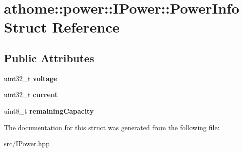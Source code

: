 \hypertarget{structathome_1_1power_1_1_i_power_1_1_power_info}{}\section{athome\+:\+:power\+:\+:I\+Power\+:\+:Power\+Info Struct Reference}
\label{structathome_1_1power_1_1_i_power_1_1_power_info}
\subsection*{Public Attributes}
\begin{DoxyCompactItemize}
\item 
\mbox{\label{structathome_1_1power_1_1_i_power_1_1_power_info_a62f956c304f45bb1b89eb81cc0c13845}} 
uint32\+\_\+t {\bfseries voltage}
\item 
\mbox{\label{structathome_1_1power_1_1_i_power_1_1_power_info_a45db3bab2d10641ead505cb2a9177e10}} 
uint32\+\_\+t {\bfseries current}
\item 
\mbox{\label{structathome_1_1power_1_1_i_power_1_1_power_info_a05e86772e61fa527dff5c2e4673ef9a9}} 
uint8\+\_\+t {\bfseries remaining\+Capacity}
\end{DoxyCompactItemize}


The documentation for this struct was generated from the following file\+:\begin{DoxyCompactItemize}
\item 
src/I\+Power.\+hpp\end{DoxyCompactItemize}
